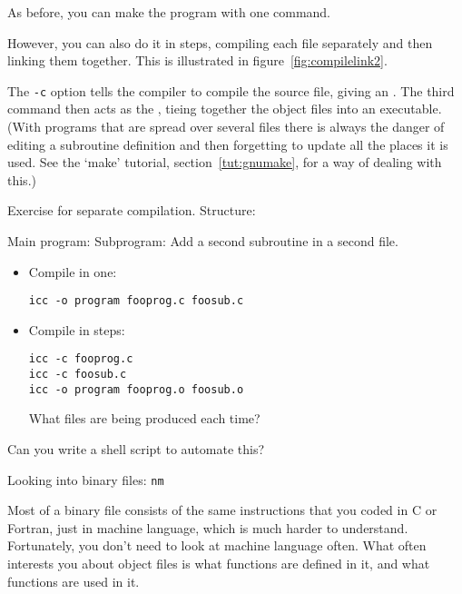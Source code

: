 As before, you can make the program with one command.


However, you can also do it in steps, compiling each file separately
and then linking them together.
This is illustrated in figure~\ref{fig:compilelink2}.


The \texttt{-c} option tells the compiler to compile the source file,
giving an . The third command then acts as the
, tieing together the object files into an
executable. (With programs that are spread over several files there is
always the danger of editing a subroutine definition and then
forgetting to update all the places it is used. See the `make'
tutorial, section~\ref{tut:gnumake}, for a way of dealing with this.) 

\begin{exercise}
  \label{ex:compile3}

  Exercise for separate compilation. Structure:
\begin{multicols}{2}
  Main program: 
  \columnbreak
  Subprogram: 
  Add a second subroutine in a second file.
\end{multicols}

  \begin{itemize}
  \item Compile in one:
\begin{verbatim}
icc -o program fooprog.c foosub.c
\end{verbatim}
\item Compile in steps:
\begin{verbatim}
icc -c fooprog.c
icc -c foosub.c
icc -o program fooprog.o foosub.o
\end{verbatim}
What files are being produced each time?
  \end{itemize}
Can you write a shell script to automate this?
\end{exercise}

 {Looking into binary files: \texttt{nm}}

Most of a binary file consists of the same instructions that you
coded in C or Fortran, just in machine language, which
is much harder to understand.
Fortunately, you don't need to look at machine language often.
What often interests you about object files is what functions are
defined in it, and what functions are used in it.

